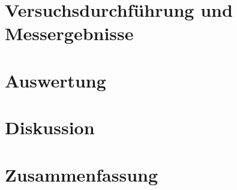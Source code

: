 \documentclass[ngerman]{scrartcl}
\begin{document}
\section{Versuchsdurchführung und Messergebnisse}
\label{sec:versuchsdurchfuehrung_messergebnisse}



\section{Auswertung}
\label{sec:auswertung}



\section{Diskussion}
\label{sec:diskussion}



\section{Zusammenfassung}
\label{sec:zusammenfassung}



\label{sec:python}





\clearpage
\printbibliography

\listoffigures

\listoftables
\end{document}
